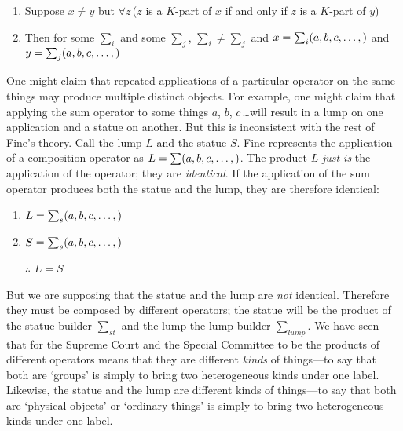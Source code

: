 \documentclass[11pt]{article}
\begin{document}
\begin{spacing}{1.5}
\begin{enumerate}
  \item Suppose $x \neq y$ but $\forall z$\,($z$ is a $K$-part of $x$
    if and only if $z$ is a $K$-part of $y$)
  \item Then for some $\sum_{i}$ and some $\sum_{j}$, $\sum_{i} \neq
    \sum_{j}$ and $x = \sum_{i}(a, b, c, \mathellipsis ,)$ and $y =
    \sum_{j}(a, b, c, \mathellipsis , )$
\end{enumerate}


One might claim that repeated applications of a particular operator on
the same things may produce multiple distinct objects.  For example,
one might claim that applying the sum operator to some things $a$,
$b$, $c$\,\ldots will result in a lump on one application and a statue
on another.  But this is inconsistent with the rest of Fine's theory.
Call the lump $L$ and the statue $S$.  Fine represents the application
of a composition operator as $L = \sum (a, b, c, \mathellipsis , )$.
The product $L$ {\em just is} the application of the operator; they
are {\em identical}.  If the application of the sum operator produces
both the statue and the lump, they are therefore identical:

\begin{enumerate}
  \item $L = \sum_{s} (a, b, c, \mathellipsis , )$
  \item $S = \sum_{s} (a, b, c, \mathellipsis , )$
  \item[$\therefore$] $L = S$
\end{enumerate}

But we are supposing that the statue and the lump are {\em not}
identical.  Therefore they must be composed by different operators;
the statue will be the product of the statue-builder $\sum _{st}$ and
the lump the lump-builder $\sum _{lump}$.  We have seen that for the
Supreme Court and the Special Committee to be the products of
different operators means that they are different {\em kinds} of
things---to say that both are `groups' is simply to bring two
heterogeneous kinds under one label.  Likewise, the statue and the
lump are different kinds of things---to say that both are `physical
objects' or `ordinary things' is simply to bring two heterogeneous
kinds under one label.


\end{spacing}
\end{document}
